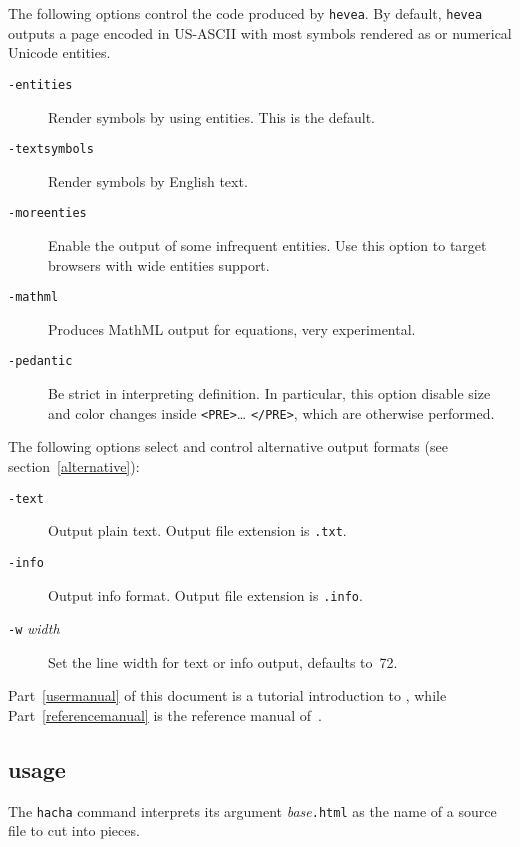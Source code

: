 The following options control the {\html} code produced by
\texttt{hevea}. By default, \texttt{hevea} outputs a page encoded in
US-ASCII with most symbols rendered as {\html} or numerical Unicode
entities.
\begin{description}
\item[{\tt -entities}] Render symbols by using entities. This is the default.
\item[{\tt -textsymbols}] Render symbols by English text.
\item[{\tt -moreenties}] Enable the output of some infrequent entities. Use
this option to target browsers with wide entities support.
\item[{\tt -mathml}] Produces MathML output for equations, very
experimental.
\item[{\tt -pedantic}]  Be strict in interpreting \html{}
definition. In particular, this option disable size and color changes inside
\verb+<PRE>+\ldots{} \verb+</PRE>+, which are otherwise performed.
\end{description}

The following options select and control alternative output formats
(see section~\ref{alternative}):
\begin{description}
\item[{\tt -text}] Output plain text. Output file
extension is \texttt{.txt}.
\item[{\tt -info}] Output info format. Output file extension
is \texttt{.info}.
\item[{\tt -w} {\it width}] Set the line width for text or info
output, defaults to~72.
\end{description}

Part~\ref{usermanual} of this document is
a tutorial introduction to \hevea{},
while Part~\ref{referencemanual} is the reference manual of~\hevea.


\subsection{\hacha{} usage}
The \texttt{hacha} command interprets its argument
\textit{base}\texttt{.html} as the name of
a \html{} source file to cut into pieces.

